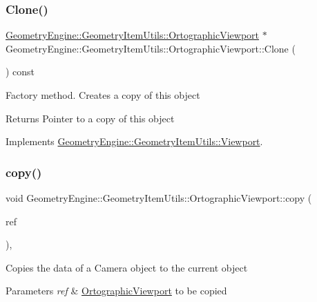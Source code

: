 \subsubsection{\texorpdfstring{Clone()}{Clone()}}
{\footnotesize\ttfamily \mbox{\hyperlink{class_geometry_engine_1_1_geometry_item_utils_1_1_ortographic_viewport}{Geometry\+Engine\+::\+Geometry\+Item\+Utils\+::\+Ortographic\+Viewport}} $\ast$ Geometry\+Engine\+::\+Geometry\+Item\+Utils\+::\+Ortographic\+Viewport\+::\+Clone (\begin{DoxyParamCaption}{ }\end{DoxyParamCaption}) const\hspace{0.3cm}{\ttfamily [virtual]}}

Factory method. Creates a copy of this object \begin{DoxyReturn}{Returns}
Pointer to a copy of this object 
\end{DoxyReturn}


Implements \mbox{\hyperlink{class_geometry_engine_1_1_geometry_item_utils_1_1_viewport_a8bd47866a001eae03f88df67fd699904}{Geometry\+Engine\+::\+Geometry\+Item\+Utils\+::\+Viewport}}.

\mbox{\label{class_geometry_engine_1_1_geometry_item_utils_1_1_ortographic_viewport_a01e153a7802a6593e0336464e3d8d3af}} 
\subsubsection{\texorpdfstring{copy()}{copy()}}
{\footnotesize\ttfamily void Geometry\+Engine\+::\+Geometry\+Item\+Utils\+::\+Ortographic\+Viewport\+::copy (\begin{DoxyParamCaption}\item[{const \mbox{\hyperlink{class_geometry_engine_1_1_geometry_item_utils_1_1_ortographic_viewport}{Ortographic\+Viewport}} \&}]{ref }\end{DoxyParamCaption})\hspace{0.3cm}{\ttfamily [protected]}, {\ttfamily [virtual]}}

Copies the data of a Camera object to the current object 
\begin{DoxyParams}{Parameters}
{\em ref} & \mbox{\hyperlink{class_geometry_engine_1_1_geometry_item_utils_1_1_ortographic_viewport}{Ortographic\+Viewport}} to be copied \\
\hline
\end{DoxyParams}


